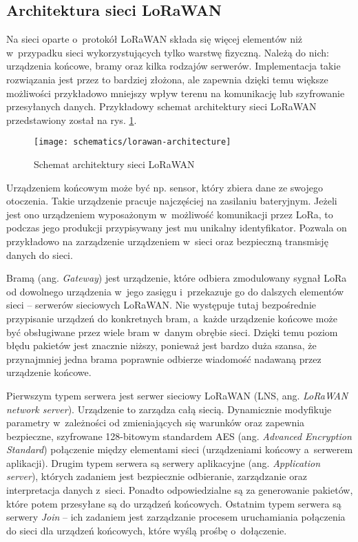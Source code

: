 \FloatBarrier
\subsection{\label{sect:lorawan-architecture}Architektura sieci LoRaWAN} Na sieci oparte o~protokół LoRaWAN składa się
więcej elementów niż w~przypadku sieci wykorzystujących tylko warstwę fizyczną. Należą do nich: urządzenia końcowe,
bramy oraz kilka rodzajów serwerów. Implementacja takie rozwiązania jest przez to bardziej złożona, ale zapewnia dzięki
temu większe możliwości przykładowo mniejszy wpływ terenu na komunikację lub szyfrowanie przesyłanych danych.
Przykładowy schemat architektury sieci LoRaWAN przedstawiony został na rys. \ref{img:lorawan-architecture}.

\begin{figure}[!htbp]
    \centering
    \texttt{[image: schematics/lorawan-architecture]}
    \caption{\label{img:lorawan-architecture}Schemat architektury sieci LoRaWAN}
\end{figure}

Urządzeniem końcowym może być np. sensor, który zbiera dane ze swojego otoczenia. Takie urządzenie pracuje najczęściej
na zasilaniu bateryjnym. Jeżeli jest ono urządzeniem wyposażonym w~możliwość komunikacji przez LoRa, to podczas jego
produkcji przypisywany jest mu unikalny identyfikator. Pozwala on przykładowo na zarządzenie urządzeniem w~sieci oraz
bezpieczną transmisję danych do sieci.

Bramą (ang. \textsl{Gateway}) jest urządzenie, które odbiera zmodulowany sygnał LoRa od dowolnego urządzenia w~jego
zasięgu i~przekazuje go do dalszych elementów sieci -- serwerów sieciowych LoRaWAN. Nie występuje tutaj bezpośrednie
przypisanie urządzeń do konkretnych bram, a~każde urządzenie końcowe może być obsługiwane przez wiele bram w~danym
obrębie sieci. Dzięki temu poziom błędu pakietów jest znacznie niższy, ponieważ jest bardzo duża szansa, że przynajmniej
jedna brama poprawnie odbierze wiadomość nadawaną przez urządzenie końcowe.

Pierwszym typem serwera jest serwer sieciowy LoRaWAN (LNS, ang. \textsl{LoRaWAN network server}). Urządzenie to zarządza
całą siecią. Dynamicznie modyfikuje parametry w~zależności od zmieniających się warunków oraz zapewnia bezpieczne,
szyfrowane 128-bitowym standardem AES (ang. \textsl{Advanced Encryption Standard}) połączenie między elementami sieci
(urządzeniami końcowy a~serwerem aplikacji). Drugim typem serwera są serwery aplikacyjne (ang. \textsl{Application
    server}), których zadaniem jest bezpiecznie odbieranie, zarządzanie oraz interpretacja danych z~sieci. Ponadto
odpowiedzialne są za generowanie pakietów, które potem przesyłane są do urządzeń końcowych. Ostatnim typem serwera są
serwery \textsl{Join} -- ich zadaniem jest zarządzanie procesem uruchamiania połączenia do sieci dla urządzeń końcowych,
które wyślą prośbę o~dołączenie.
